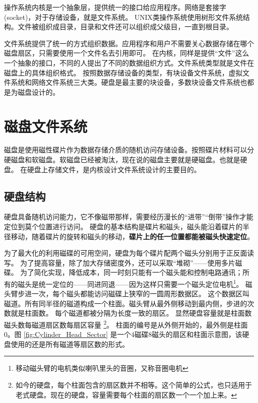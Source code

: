 
操作系统内核是一个抽象层，提供统一的接口给应用程序。网络是套接字(socket)，对于存储设备，就是文件系统。
UNIX类操作系统使用树形文件系统结构。文件被组织成目录，目录和文件还可以组织成父级目，一直到根目录。


文件系统提供了统一的方式组织数据。应用程序和用户不需要关心数据存储在哪个磁盘扇区，只需要使用一个文件名去引用即可。
在内核，同样是提供“文件”这么一个抽象的接口，不同的人提出了不同的数据组织方式。文件系统类型就是文件在磁盘上的具体组织格式。
按照数据存储设备的类型，有块设备文件系统，虚拟文件系统和网络文件系统三大类。硬盘是最主要的块设备，多数块设备文件系统也都是为磁盘设计的。

\section{磁盘文件系统}

磁盘是使用磁性碟片作为数据存储介质的随机访问存储设备。按照碟片材料可以分硬磁盘和软磁盘。软磁盘已经被淘汰，现在说的磁盘主要就是硬磁盘。也就是硬盘。
在硬盘上存储文件，是内核设计文件系统设计的主要目的。

\subsection{硬盘结构}


硬盘具备随机访问能力，它不像磁带那样，需要经历漫长的“进带”“倒带”操作才能定位到莫个位置进行访问。
硬盘的基本结构是碟片和磁头，磁头能沿着碟片的半径移动，随着碟片的旋转和磁头的移动，\textbf{碟片上的任一位置都能被磁头快速定位}。

为了最大化的利用磁碟的可用空间，硬盘为每个碟片配两个磁头分别用于正反面读写。
为了提高容量，除了加大存储密度外，还可以采取“堆砌”——使用多片磁碟。
为了简化实现，降低成本，同一时刻只能有一个磁头能和控制电路通讯；所有的磁头是统一定位的——同进同退——因为这样只需要一个磁头定位电机\footnote{移动磁头臂的电机类似喇叭里头的音圈，又称音圈电机}。
磁头臂步进一次，每个磁头都能访问磁碟上狭窄的一圆周形数据区。
这个数据区叫磁道。所有同半径的磁道构成一个柱面。磁头臂从最外侧移动到最内侧，步进的次数就是柱面数。
每个磁道都被分隔为长度一致的扇区。
显然硬盘容量就是柱面数\texttimes{}磁头数\texttimes{}每磁道扇区数\texttimes{}每扇区容量 \footnote{如今的硬盘，每个柱面包含的扇区数并不相等。这个简单的公式，也只适用于老式硬盘。现在的硬盘，容量需要每个柱面的扇区数一个一个加上来。}。
柱面的编号是从外侧开始的，最外侧是柱面0。图 \ref{fig:Cylinder_Head_Sector} 是一个4磁碟8磁头的扇区和柱面示意图，该硬盘使用的还是所有磁道等扇区数的形式。

